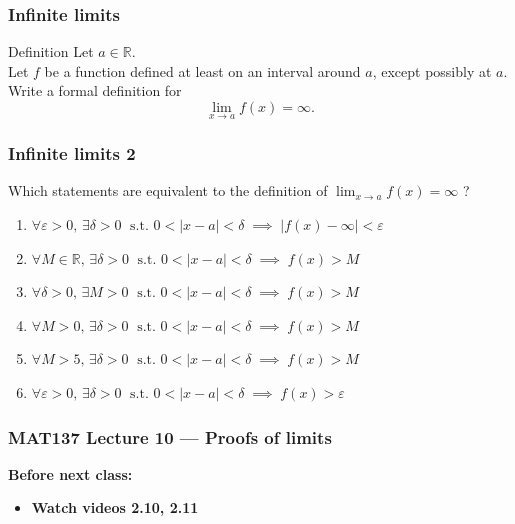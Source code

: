 \documentclass[14pt]{beamer}
\newcommand {\DS} [1] {${\displaystyle #1}$}
\newcommand {\R}{\mathbb{R}}
\begin{document}
\begin{frame}
\frametitle{Infinite limits}

\begin{block}{Definition}
Let $a \in \mathbb{R}$. \\
Let $f$ be a function defined at least on an interval around $a$, except possibly at $a$. \\
Write a formal definition for
	$$
		\lim_{x \to a} f(x) = \infty.
	$$
\end{block}

\end{frame}
\begin{frame}[t]
\frametitle{Infinite limits 2}

Which statements are equivalent to the definition of \DS{\lim_{x \to a} f(x) = \infty } ?
\vfill
\small
\begin{enumerate}
	\item \DS{\forall \varepsilon>0, \, \exists \delta > 0 \; \mbox{ s.t. } 0 < |x-a|<\delta \; \implies \; |f(x)-\infty| < \varepsilon}
	\vfill
	\item \DS{\forall M \in \R, \, \exists \delta > 0 \; \mbox{ s.t. } 0 < |x-a|<\delta \; \implies \; f(x) > M}
	\vfill
	\item \DS{\forall \delta>0, \, \exists M > 0 \; \mbox{ s.t. } 0 < |x-a|<\delta \; \implies \; f(x) > M}
	\vfill
	\item \DS{\forall M > 0, \, \exists \delta > 0 \; \mbox{ s.t. } 0 < |x-a|<\delta \; \implies \; f(x) > M}
	\vfill
	\item \DS{\forall M > 5, \, \exists \delta > 0 \; \mbox{ s.t. } 0 < |x-a|<\delta \; \implies \; f(x) > M}
	\vfill
	\item \DS{\forall \varepsilon > 0, \, \exists \delta > 0 \; \mbox{ s.t. } 0 < |x-a|<\delta \; \implies \; f(x) > \varepsilon}
\end{enumerate}

\end{frame}

\begin{frame}
\frametitle{MAT137 Lecture 10 --- Proofs of limits}
	{\bf Before next class:}
		\begin{itemize} \normalsize
			\item {\bf Watch videos 2.10, 2.11 }
		\end{itemize}
	\vfill

\end{frame}
\end{document}
